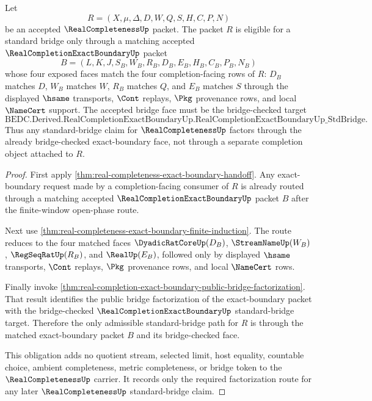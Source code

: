 \begin{theorem}
\label{thm:real-completion-exact-boundary-standard-bridge-obligation}
Let
$$
R=(X,\mu,\Delta,D,W,Q,S,H,C,P,N)
$$
be an accepted $\RealCompletenessUp$ packet. The packet $R$ is eligible for a standard bridge only through a matching accepted $\RealCompletionExactBoundaryUp$ packet
$$
B=(L,K,J,S_B,W_B,R_B,D_B,E_B,H_B,C_B,P_B,N_B)
$$
whose four exposed faces match the four completion-facing rows of $R$: $D_B$ matches $D$, $W_B$ matches $W$, $R_B$ matches $Q$, and $E_B$ matches $S$ through the displayed $\hsame$ transports, $\Cont$ replays, $\Pkg$ provenance rows, and local $\NameCert$ support. The accepted bridge face must be the bridge-checked target
$$
\text{BEDC.Derived.RealCompletionExactBoundaryUp.RealCompletionExactBoundaryUp\_StdBridge}.
$$
Thus any standard-bridge claim for $\RealCompletenessUp$ factors through the already bridge-checked exact-boundary face, not through a separate completion object attached to $R$.
\end{theorem}
\begin{proof}
First apply \autoref{thm:real-completeness-exact-boundary-handoff}. Any exact-boundary request made by a completion-facing consumer of $R$ is already routed through a matching accepted $\RealCompletionExactBoundaryUp$ packet $B$ after the finite-window open-phase route.

Next use \autoref{thm:real-completeness-exact-boundary-finite-induction}. The route reduces to the four matched faces $\DyadicRatCoreUp(D_B)$, $\StreamNameUp(W_B)$, $\RegSeqRatUp(R_B)$, and $\RealUp(E_B)$, followed only by displayed $\hsame$ transports, $\Cont$ replays, $\Pkg$ provenance rows, and local $\NameCert$ rows.

Finally invoke \autoref{thm:real-completion-exact-boundary-public-bridge-factorization}. That result identifies the public bridge factorization of the exact-boundary packet with the bridge-checked $\RealCompletionExactBoundaryUp$ standard-bridge target. Therefore the only admissible standard-bridge path for $R$ is through the matched exact-boundary packet $B$ and its bridge-checked face.

This obligation adds no quotient stream, selected limit, host equality, countable choice, ambient completeness, metric completeness, or bridge token to the $\RealCompletenessUp$ carrier. It records only the required factorization route for any later $\RealCompletenessUp$ standard-bridge claim.
\end{proof}

